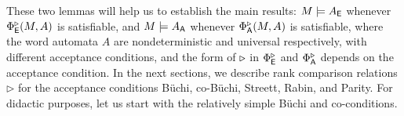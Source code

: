 These two lemmas will help us to establish the main results:
$M \models A_{\operatorname{\mathsf{E}}}$ whenever $\Phi^{\triangleright}_{\operatorname{\mathsf{E}}}(M,A)$ is satisfiable, and
$M \models A_{\operatorname{\mathsf{A}}}$ whenever $\Phi^{\triangleright}_{\operatorname{\mathsf{A}}}(M,A)$ is satisfiable,
where the word automata $A$ are nondeterministic and universal respectively,
with different acceptance conditions,
and the form of $\triangleright$ in $\Phi^{\triangleright}_{\operatorname{\mathsf{E}}}$ and $\Phi^{\triangleright}_{\operatorname{\mathsf{A}}}$ depends on the acceptance condition.
In the next sections, we describe rank comparison relations
$\triangleright$ for the acceptance conditions B\"uchi, co-B\"uchi,
Streett, Rabin, and Parity.
For didactic purposes,
let us start with the relatively simple B\"uchi and co-\buchi conditions.



